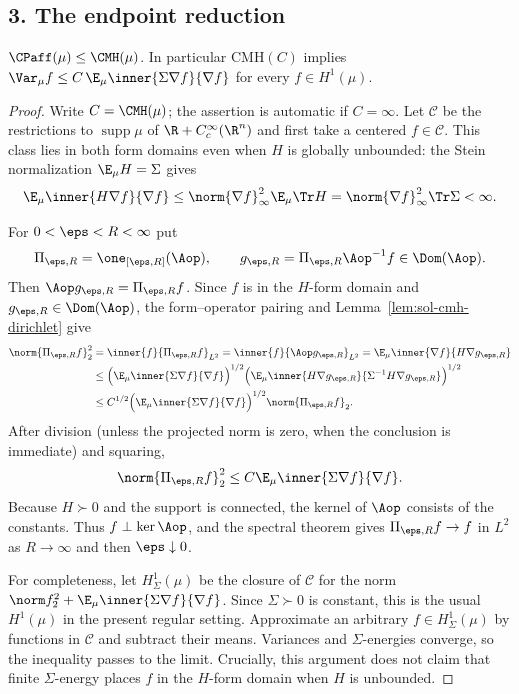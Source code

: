 \documentclass[../main.tex]{subfiles}
\begin{document}
\subsection*{3. The endpoint reduction}

\begin{theorem}[= Theorem~\ref{thm:cmh-implies-affine-poincare}]
\label{thm:sol-cmh-implies}
$\CPaff(\mu)\le\CMH(\mu)$. In particular $\mathrm{CMH}(C)$ implies
$\Var_\mu f\le C\,\E_\mu\inner{\Sigma\nabla f}{\nabla f}$ for every $f\in H^1(\mu)$.
\end{theorem}

\begin{proof}
Write $C=\CMH(\mu)$; the assertion is automatic if $C=\infty$.  Let $\mathscr C$ be the
restrictions to $\operatorname{supp}\mu$ of $\R+C_c^\infty(\R^n)$ and first take a centered
$f\in\mathscr C$.  This class lies in both form domains even when $H$ is globally unbounded:
the Stein normalization $\E_\mu H=\Sigma$ gives
\[
  \E_\mu\inner{H\nabla f}{\nabla f}
  \le \norm{\nabla f}_\infty^2\E_\mu\Tr H
  =\norm{\nabla f}_\infty^2\Tr\Sigma<\infty.
\]

For $0<\eps<R<\infty$ put
\[
  \Pi_{\eps,R}=\one_{[\eps,R]}(\Aop),
  \qquad g_{\eps,R}=\Pi_{\eps,R}\Aop^{-1}f\in\Dom(\Aop).
\]
Then $\Aop g_{\eps,R}=\Pi_{\eps,R}f$.  Since $f$ is in the $H$-form domain and
$g_{\eps,R}\in\Dom(\Aop)$, the form--operator pairing and
Lemma~\ref{lem:sol-cmh-dirichlet} give
\begin{align*}
  \norm{\Pi_{\eps,R}f}_2^2
  &=\inner{f}{\Pi_{\eps,R}f}_{L^2}
    =\inner{f}{\Aop g_{\eps,R}}_{L^2}
    =\E_\mu\inner{\nabla f}{H\nabla g_{\eps,R}}\\
  &\le\Bigl(\E_\mu\inner{\Sigma\nabla f}{\nabla f}\Bigr)^{1/2}
     \Bigl(\E_\mu\inner{H\nabla g_{\eps,R}}
                             {\Sigma^{-1}H\nabla g_{\eps,R}}\Bigr)^{1/2}\\
  &\le C^{1/2}
     \Bigl(\E_\mu\inner{\Sigma\nabla f}{\nabla f}\Bigr)^{1/2}
     \norm{\Pi_{\eps,R}f}_2.
\end{align*}
After division (unless the projected norm is zero, when the conclusion is immediate) and
squaring,
\[
  \norm{\Pi_{\eps,R}f}_2^2
  \le C\E_\mu\inner{\Sigma\nabla f}{\nabla f}.
\]
Because $H\succ0$ and the support is connected, the kernel of $\Aop$ consists of the constants.
Thus $f\perp\ker\Aop$, and the spectral theorem gives
$\Pi_{\eps,R}f\to f$ in $L^2$ as $R\to\infty$ and then $\eps\downarrow0$.

For completeness, let $H^1_\Sigma(\mu)$ be the closure of $\mathscr C$ for the norm
$\norm f_2^2+\E_\mu\inner{\Sigma\nabla f}{\nabla f}$.  Since $\Sigma\succ0$ is constant, this
is the usual $H^1(\mu)$ in the present regular setting.  Approximate an arbitrary
$f\in H^1_\Sigma(\mu)$ by functions in $\mathscr C$ and subtract their means.  Variances and
$\Sigma$-energies converge, so the inequality passes to the limit.  Crucially, this argument
does not claim that finite $\Sigma$-energy places $f$ in the $H$-form domain when $H$ is
unbounded.
\end{proof}
\end{document}
